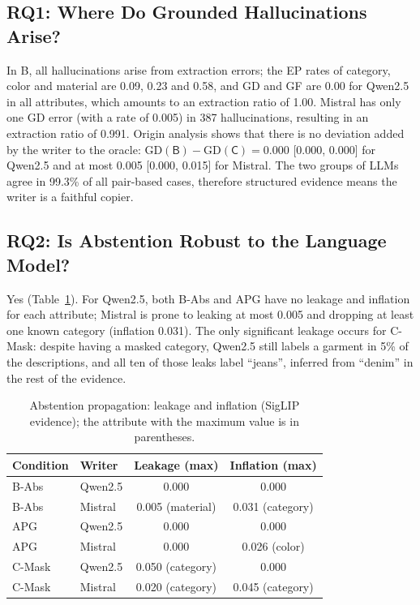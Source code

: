 \documentclass[runningheads]{llncs}
\newcommand{\cond}[1]{\textsf{#1}}
\begin{document}
\subsection{RQ1: Where Do Grounded Hallucinations Arise?}
In \cond{B}, all hallucinations arise from extraction errors; the EP rates of category, color and material are 0.09, 0.23 and 0.58, and GD and GF are 0.00 for Qwen2.5 in all attributes, which amounts to an extraction ratio of 1.00. Mistral has only one GD error (with a rate of 0.005) in 387 hallucinations, resulting in an extraction ratio of 0.991. Origin analysis shows that there is no deviation added by the writer to the oracle: $\mathrm{GD}(\cond{B})-\mathrm{GD}(\cond{C})=0.000$ [0.000, 0.000] for Qwen2.5 and at most 0.005 [0.000, 0.015] for Mistral. The two groups of LLMs agree in 99.3\% of all pair-based cases, therefore structured evidence means the writer is a faithful copier.

\subsection{RQ2: Is Abstention Robust to the Language Model?}
Yes (Table~\ref{tab:abst}). For Qwen2.5, both \cond{B-Abs} and \cond{APG} have no leakage and inflation for each attribute; Mistral is prone to leaking at most 0.005 and dropping at least one known category (inflation 0.031). The only significant leakage occurs for \cond{C-Mask}: despite having a masked category, Qwen2.5 still labels a garment in 5\% of the descriptions, and all ten of those leaks label ``jeans'', inferred from ``denim'' in the rest of the evidence.

\begin{table}[!htb]
\caption{Abstention propagation: leakage and inflation (SigLIP evidence); the attribute with the maximum value is in parentheses.}
\label{tab:abst}
\centering
\footnotesize
\setlength{\tabcolsep}{5pt}
\begin{tabular}{@{}llcc@{}}
\toprule
Condition & Writer & Leakage (max) & Inflation (max) \\
\midrule
\cond{B-Abs} & Qwen2.5 & 0.000 & 0.000 \\
\cond{B-Abs} & Mistral & 0.005 (material) & 0.031 (category) \\
\cond{APG} & Qwen2.5 & 0.000 & 0.000 \\
\cond{APG} & Mistral & 0.000 & 0.026 (color) \\
\cond{C-Mask} & Qwen2.5 & 0.050 (category) & 0.000 \\
\cond{C-Mask} & Mistral & 0.020 (category) & 0.045 (category) \\
\bottomrule
\end{tabular}
\end{table}
\end{document}
